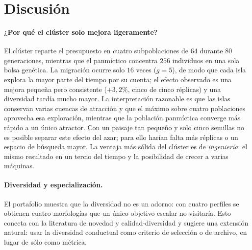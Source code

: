 \documentclass[11pt,a4paper]{article}
\begin{document}
\begin{table}[t]
\centering
\caption{Rendimiento de la evaluaci\'on (un n\'ucleo, $T=20\,000$,
100 repeticiones).}
\label{tab:bench}

\end{table}

\section{Discusi\'on}\label{sec:discussion}

\paragraph{\texorpdfstring{¿Por qu\'e el cl\'uster solo mejora ligeramente?}{Por que el cluster solo mejora ligeramente?}}
El cl\'uster reparte el presupuesto en cuatro subpoblaciones de $64$ durante
$80$ generaciones, mientras que el panm\'ictico concentra $256$ individuos en
una sola bolsa gen\'etica.  La migraci\'on ocurre solo $16$ veces ($g=5$), de
modo que cada isla explora la mayor parte del tiempo por su cuenta; el efecto
observado es una mejora peque\~na pero consistente ($+3{,}2\%$, cinco de cinco
r\'eplicas) y una diversidad tard\'ia mucho mayor.  La interpretaci\'on
razonable es que las islas conservan varias cuencas de atracci\'on y que el
m\'aximo sobre cuatro poblaciones aprovecha esa exploraci\'on, mientras que la
poblaci\'on panm\'ictica converge m\'as r\'apido a un \'unico atractor.  Con un
paisaje tan peque\~no y solo cinco semillas no es posible separar este efecto
del azar; para ello har\'ian falta m\'as r\'eplicas o un espacio de b\'usqueda
mayor.  La ventaja m\'as s\'olida del cl\'uster es de \emph{ingenier\'ia}: el
mismo resultado en un tercio del tiempo y la posibilidad de crecer a varias
m\'aquinas.

\paragraph{Diversidad y especializaci\'on.}
El portafolio muestra que la diversidad no es un adorno: con cuatro perfiles se
obtienen cuatro morfolog\'ias que un \'unico objetivo escalar no visitar\'ia.
Esto conecta con la literatura de novedad y calidad-diversidad
\citep{lehman2011} y sugiere una extensi\'on natural: usar la diversidad
conductual como criterio de selecci\'on o de archivo, en lugar de s\'olo como
m\'etrica.
\end{document}
